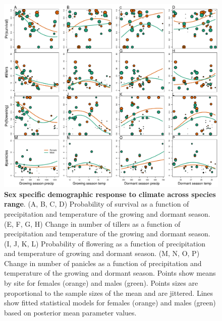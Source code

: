 \documentclass[12pt]{article}\usepackage[]{graphicx}\usepackage[dvipsnames]{xcolor}
\begin{document}
\begin{figure}[H]
	\begin{center}
		\includegraphics[width=0.95\linewidth]{Figures/vital_rates_v1.pdf}
		\caption{\textbf{Sex specific demographic response to climate across species range}.
			(A, B, C, D) Probability of survival as a function of precipitation and temperature of the growing and dormant season.
			(E, F, G, H) Change in number of tillers as a function of precipitation and temperature of the growing and dormant season.
			(I, J, K, L) Probability of flowering as a function of precipitation and temperature of growing and dormant season.
			(M, N, O, P) Change in number of panicles as a function of precipitation and temperature of the growing and dormant season.
			Points show means by site for females (orange) and males (green). 
			Points sizes are proportional to the sample sizes of the mean and are jittered.
			Lines show fitted statistical models for females (orange) and males (green) based on posterior mean parameter values.
		}
		\label{fig:vital_rates}
	\end{center}
\end{figure}
\end{document}
